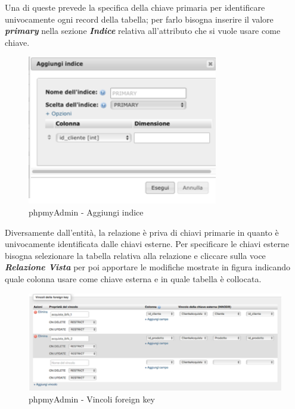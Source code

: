 Una di queste prevede la specifica della chiave primaria per identificare univocamente ogni record della tabella; per farlo bisogna inserire il valore \textit{\textbf{primary}} nella sezione \textit{\textbf{Indice}} relativa all'attributo che si vuole usare come chiave.

\begin{center}
\begin{figure}[H]
\centering
\includegraphics[scale=1]{figures/phpmyAdmin_addindex.png}
\caption{phpmyAdmin - Aggiungi indice} 
\end{figure}
\end{center}

Diversamente dall'entità, la relazione è priva di chiavi primarie in quanto è univocamente identificata dalle chiavi esterne. Per specificare le chiavi esterne bisogna selezionare la tabella relativa alla relazione e cliccare sulla voce \textit{\textbf{Relazione Vista}} per poi apportare le modifiche mostrate in figura indicando quale colonna usare come chiave esterna e in quale tabella è collocata.

\begin{center}
\begin{figure}[H]
\centering
\includegraphics[scale=0.8]{figures/phpmyAdmin_foreignkey.png}
\caption{phpmyAdmin - Vincoli foreign key} 
\end{figure}
\end{center}

